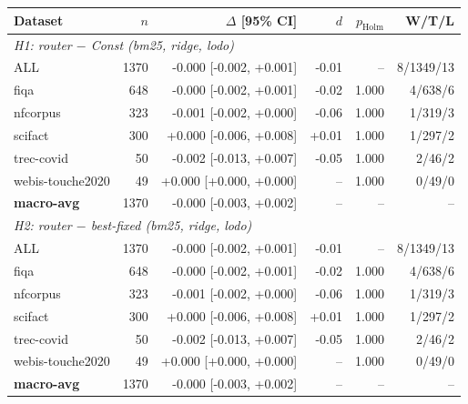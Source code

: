 \begin{tabular}{lrrrrr}
\hline
Dataset & $n$ & $\Delta$ [95\% CI] & $d$ & $p_{\mathrm{Holm}}$ & W/T/L \\
\hline
\multicolumn{6}{l}{\textit{H1: router $-$ Const (bm25, ridge, lodo)}} \\
ALL & 1370 & -0.000 [-0.002, +0.001] & -0.01 & -- & 8/1349/13 \\
fiqa & 648 & -0.000 [-0.002, +0.001] & -0.02 & 1.000 & 4/638/6 \\
nfcorpus & 323 & -0.001 [-0.002, +0.000] & -0.06 & 1.000 & 1/319/3 \\
scifact & 300 & +0.000 [-0.006, +0.008] & +0.01 & 1.000 & 1/297/2 \\
trec-covid & 50 & -0.002 [-0.013, +0.007] & -0.05 & 1.000 & 2/46/2 \\
webis-touche2020 & 49 & +0.000 [+0.000, +0.000] & -- & 1.000 & 0/49/0 \\
\textbf{macro-avg} & 1370 & -0.000 [-0.003, +0.002] & -- & -- & -- \\
\hline
\multicolumn{6}{l}{\textit{H2: router $-$ best-fixed (bm25, ridge, lodo)}} \\
ALL & 1370 & -0.000 [-0.002, +0.001] & -0.01 & -- & 8/1349/13 \\
fiqa & 648 & -0.000 [-0.002, +0.001] & -0.02 & 1.000 & 4/638/6 \\
nfcorpus & 323 & -0.001 [-0.002, +0.000] & -0.06 & 1.000 & 1/319/3 \\
scifact & 300 & +0.000 [-0.006, +0.008] & +0.01 & 1.000 & 1/297/2 \\
trec-covid & 50 & -0.002 [-0.013, +0.007] & -0.05 & 1.000 & 2/46/2 \\
webis-touche2020 & 49 & +0.000 [+0.000, +0.000] & -- & 1.000 & 0/49/0 \\
\textbf{macro-avg} & 1370 & -0.000 [-0.003, +0.002] & -- & -- & -- \\
\hline
\end{tabular}